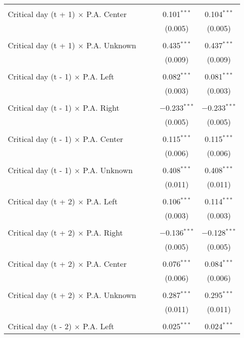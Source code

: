 \documentclass[
]{article}
\begin{document}
\begin{table}[!htbp]
{\begin{tabular}{@{\extracolsep{5pt}}lcccc}
  & & & & \\ 
 Critical day (t + 1) $\times$ P.A. Center &  &  & 0.101$^{***}$ & 0.104$^{***}$ \\ 
  &  &  & (0.005) & (0.005) \\ 
  & & & & \\ 
 Critical day (t + 1) $\times$ P.A. Unknown &  &  & 0.435$^{***}$ & 0.437$^{***}$ \\ 
  &  &  & (0.009) & (0.009) \\ 
  & & & & \\ 
 Critical day (t - 1) $\times$ P.A. Left &  &  & 0.082$^{***}$ & 0.081$^{***}$ \\ 
  &  &  & (0.003) & (0.003) \\ 
  & & & & \\ 
 Critical day (t - 1) $\times$ P.A. Right &  &  & $-$0.233$^{***}$ & $-$0.233$^{***}$ \\ 
  &  &  & (0.005) & (0.005) \\ 
  & & & & \\ 
 Critical day (t - 1) $\times$ P.A. Center &  &  & 0.115$^{***}$ & 0.115$^{***}$ \\ 
  &  &  & (0.006) & (0.006) \\ 
  & & & & \\ 
 Critical day (t - 1) $\times$ P.A. Unknown &  &  & 0.408$^{***}$ & 0.408$^{***}$ \\ 
  &  &  & (0.011) & (0.011) \\ 
  & & & & \\ 
 Critical day (t + 2) $\times$ P.A. Left &  &  & 0.106$^{***}$ & 0.114$^{***}$ \\ 
  &  &  & (0.003) & (0.003) \\ 
  & & & & \\ 
 Critical day (t + 2) $\times$ P.A. Right &  &  & $-$0.136$^{***}$ & $-$0.128$^{***}$ \\ 
  &  &  & (0.005) & (0.005) \\ 
  & & & & \\ 
 Critical day (t + 2) $\times$ P.A. Center &  &  & 0.076$^{***}$ & 0.084$^{***}$ \\ 
  &  &  & (0.006) & (0.006) \\ 
  & & & & \\ 
 Critical day (t + 2) $\times$ P.A. Unknown &  &  & 0.287$^{***}$ & 0.295$^{***}$ \\ 
  &  &  & (0.011) & (0.011) \\ 
  & & & & \\ 
 Critical day (t - 2) $\times$ P.A. Left &  &  & 0.025$^{***}$ & 0.024$^{***}$ \\ 

\end{tabular}}
\end{table}
\end{document}
